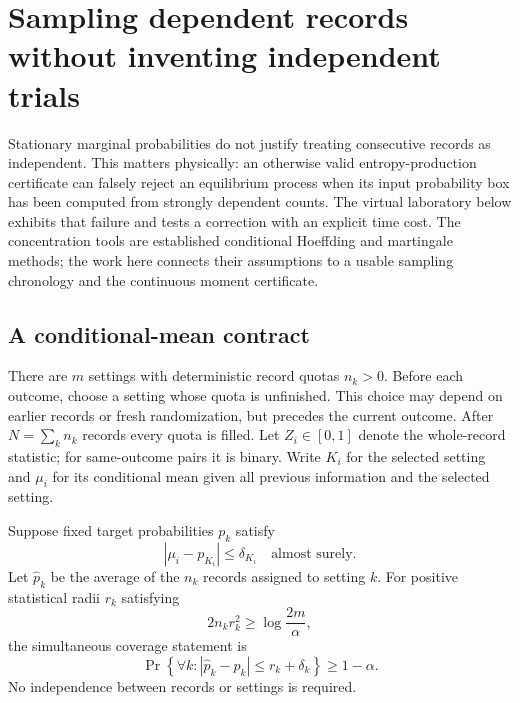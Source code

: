 \chapter{Sampling dependent records without inventing independent trials}
\label{vl:sampling}

Stationary marginal probabilities do not justify treating consecutive records
as independent. This matters physically: an otherwise valid entropy-production
certificate can falsely reject an equilibrium process when its input probability
box has been computed from strongly dependent counts. The virtual laboratory
below exhibits that failure and tests a correction with an explicit time cost.
The concentration tools are established conditional Hoeffding and martingale
methods\cite{caHoeffding1963,vlHoward2021}; the work here connects their
assumptions to a usable sampling chronology and the continuous moment
certificate.

\section{A conditional-mean contract}

There are $m$ settings with deterministic record quotas $n_k>0$. Before each
outcome, choose a setting whose quota is unfinished. This choice may depend on
earlier records or fresh randomization, but precedes the current outcome.
After $N=\sum_k n_k$ records every quota is filled. Let $Z_i\in[0,1]$ denote
the whole-record statistic; for same-outcome pairs it is binary. Write $K_i$
for the selected setting and $\mu_i$ for its conditional mean given all
previous information and the selected setting.

\begin{theorem}
\label{vl:conditional-box}
Suppose fixed target probabilities $p_k$ satisfy
\begin{equation}
 |\mu_i-p_{K_i}|\le\delta_{K_i}
 \quad\text{almost surely}.
 \label{vl:conditional-bias}
\end{equation}
Let $\widehat p_k$ be the average of the $n_k$ records assigned to setting $k$.
For positive statistical radii $r_k$ satisfying
\begin{equation}
 2n_k r_k^2\ge\log\frac{2m}{\alpha},
 \label{vl:radius-check}
\end{equation}
the simultaneous coverage statement is
\begin{equation}
 \Pr\!\left\{\forall k:
 |\widehat p_k-p_k|\le r_k+\delta_k\right\}\ge1-\alpha.
 \label{vl:dependent-box}
\end{equation}
No independence between records or settings is required.
\end{theorem}

